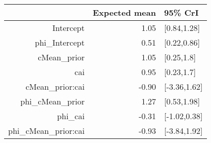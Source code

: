 \begin{tabular}{rrl}
  \hline
 & Expected mean & 95\% CrI \\ 
  \hline
Intercept & 1.05 & [0.84,1.28] \\ 
  phi\_Intercept & 0.51 & [0.22,0.86] \\ 
  cMean\_prior & 1.05 & [0.25,1.8] \\ 
  cai & 0.95 & [0.23,1.7] \\ 
  cMean\_prior:cai & -0.90 & [-3.36,1.62] \\ 
  phi\_cMean\_prior & 1.27 & [0.53,1.98] \\ 
  phi\_cai & -0.31 & [-1.02,0.38] \\ 
  phi\_cMean\_prior:cai & -0.93 & [-3.84,1.92] \\ 
   \hline
\end{tabular}

